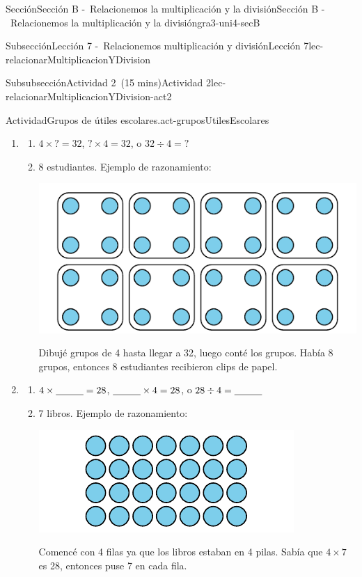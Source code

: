\documentclass[oneside,10pt,]{article}
\begin{document}
\begin{sectionptx}{Sección}{Sección B -~Relacionemos la multiplicación y la división}{}{Sección B -~Relacionemos la multiplicación y la división}{}{}{gra3-uni4-secB}
\begin{subsectionptx}{Subsección}{Lección 7 -~Relacionemos multiplicación y división}{}{Lección 7}{}{}{lec-relacionarMultiplicacionYDivision}
\begin{subsubsectionptx}{Subsubsección}{Actividad 2~(15 mins)}{}{Actividad 2}{}{}{lec-relacionarMultiplicacionYDivision-act2}
\begin{activity}{Actividad}{Grupos de útiles escolares.}{act-gruposUtilesEscolares}
\begin{enumerate}
\item{}%
\begin{enumerate}
\item{}\(4 \times {?} = 32\), \({?} \times 4 = 32\), o \(32 \div 4 = {?} \)%
\item{}8 estudiantes. Ejemplo de razonamiento:%
\begin{image}{0}{1}{0}{}%
\includegraphics[width=\linewidth]{external/svg-source/tikz-file-149318.pdf}
\end{image}%
Dibujé grupos de 4 hasta llegar a 32, luego conté los grupos. Había 8 grupos, entonces 8 estudiantes recibieron clips de papel.%
\end{enumerate}
%
\item{}%
\begin{enumerate}
\item{}\(4 \times \underline{\hspace{1 cm}} = 28\), \(\underline{\hspace{1 cm}} \times 4 = 28\), o \(28 \div 4 = \underline{\hspace{1 cm}}\)%
\item{}7 libros. Ejemplo de razonamiento:%
\begin{image}{0}{1}{0}{}%
\includegraphics[width=\linewidth]{external/svg-source/tikz-file-149319.pdf}
\end{image}%
Comencé con 4 filas ya que los libros estaban en 4 pilas. Sabía que \(4 \times 7\) es 28, entonces puse 7 en cada fila.%

\end{enumerate}
\end{enumerate}
\end{activity}
\end{subsubsectionptx}
\end{subsectionptx}
\end{sectionptx}
\end{document}
